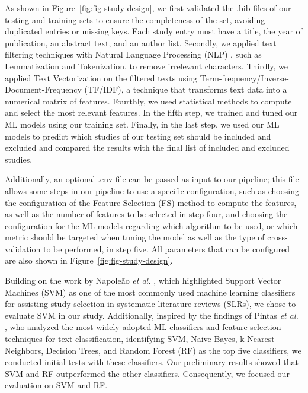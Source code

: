As shown in Figure~\ref{fig:fig-study-design}, we first validated the .bib files of our testing and training sets to ensure the completeness of the set, avoiding duplicated entries or missing keys. Each study entry must have a title, the year of publication, an abstract text, and an author list. 
Secondly, we applied text filtering techniques with Natural Language Processing (NLP) \cite{NLTK}, such as Lemmatization and Tokenization, to remove irrelevant characters. Thirdly, we applied Text Vectorization on the filtered texts using  Term-frequency/Inverse-Document-Frequency (TF/IDF), a technique that transforms text data into a numerical matrix of features. Fourthly, we used statistical methods to compute and select the most relevant features. In the fifth step, we trained and tuned our ML models using our training set. Finally, in the last step, we used our ML models to predict which studies of our testing set should be included and excluded and compared the results with the final list of included and excluded studies.

Additionally, an optional .env file can be passed as input to our pipeline; this file allows some steps in our pipeline to use a specific configuration, such as choosing the configuration of the Feature Selection (FS) method to compute the features, as well as the number of features to be selected in step four, and choosing the configuration for the ML models regarding which algorithm to be used, or which metric should be targeted when tuning the model as well as the type of cross-validation to be performed, in step five. All parameters that can be configured are also shown in Figure~\ref{fig:fig-study-design}.

Building on the work by Napoleão \textit{et al.} \cite{Napoleao2021}, which highlighted Support Vector Machines (SVM) as one of the most commonly used machine learning classifiers for assisting study selection in systematic literature reviews (SLRs), we chose to evaluate SVM in our study. Additionally, inspired by the findings of Pintas \textit{et al.} \cite{pintas2021feature}, who analyzed the most widely adopted ML classifiers and feature selection techniques for text classification, identifying SVM, Naive Bayes, k-Nearest Neighbors, Decision Trees, and Random Forest (RF) as the top five classifiers, we conducted initial tests with these classifiers. Our preliminary results showed that SVM and RF outperformed the other classifiers. Consequently, we focused our evaluation on SVM and RF.



